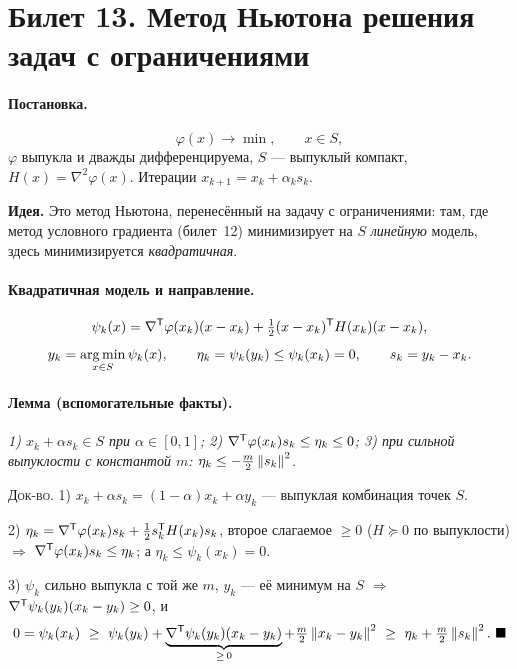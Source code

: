 \section{Билет 13. Метод Ньютона решения задач с ограничениями}


\paragraph{Постановка.}
\[
  \varphi(x) \to \min , \qquad x \in S ,
\]
$\varphi$ выпукла и дважды дифференцируема, $S$ — выпуклый компакт,
$H(x) = \nabla^2\varphi(x)$. Итерации $x_{k+1} = x_k + \alpha_k s_k$.

\textbf{Идея.} Это метод Ньютона, перенесённый на задачу с ограничениями: там,
где метод условного градиента (билет~12) минимизирует на $S$ \emph{линейную}
модель, здесь минимизируется \emph{квадратичная}.

\paragraph{Квадратичная модель и направление.}
\[
  \psi_k(x) = \nabla^{\mathsf{T}}\varphi(x_k)(x - x_k)
            + \tfrac12 (x - x_k)^{\mathsf{T}} H(x_k)(x - x_k) ,
\]
\[
  y_k = \operatorname*{arg\,min}_{x \in S}\psi_k(x) , \qquad
  \eta_k = \psi_k(y_k) \le \psi_k(x_k) = 0 , \qquad
  s_k = y_k - x_k .
\]

\paragraph{Лемма (вспомогательные факты).}
\textit{1) $x_k + \alpha s_k \in S$ при $\alpha \in [0,1]$;
2) $\nabla^{\mathsf{T}}\varphi(x_k)s_k \le \eta_k \le 0$;
3) при сильной выпуклости с константой $m$: $\eta_k \le -\tfrac{m}{2}\left\lVert s_k \right\rVert^2$.}

\textsc{Док-во.}
1) $x_k + \alpha s_k = (1-\alpha)x_k + \alpha y_k$ — выпуклая комбинация точек
$S$.

2) $\eta_k = \nabla^{\mathsf{T}}\varphi(x_k)s_k + \tfrac12 s_k^{\mathsf{T}} H(x_k)s_k$, второе
слагаемое $\ge 0$ ($H \succeq 0$ по выпуклости) $\Rightarrow$
$\nabla^{\mathsf{T}}\varphi(x_k)s_k \le \eta_k$; а $\eta_k \le \psi_k(x_k) = 0$.

3) $\psi_k$ сильно выпукла с той же $m$, $y_k$ — её минимум на $S$
$\Rightarrow$ $\nabla^{\mathsf{T}}\psi_k(y_k)(x_k - y_k) \ge 0$, и
\[
  0 = \psi_k(x_k) \ \ge\ \psi_k(y_k)
    + \underbrace{\nabla^{\mathsf{T}}\psi_k(y_k)(x_k-y_k)}_{\ge\,0}
    + \tfrac{m}{2}\left\lVert x_k - y_k \right\rVert^2
  \ \ge\ \eta_k + \tfrac{m}{2}\left\lVert s_k \right\rVert^2 . \ \blacksquare
\]


